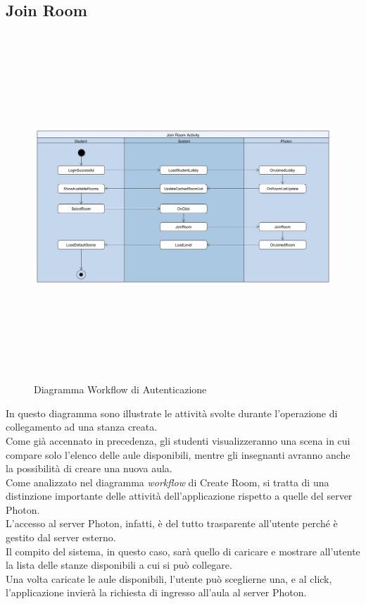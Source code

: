 \subsection{Join Room}
\begin{figure}[H]
    \centering
    \includegraphics[width = 17cm, height = 13cm]{Immagini/JoinRoomActivityDiagram.jpg}
    \caption{Diagramma Workflow di Autenticazione}
    \label{fig:my_label}
\end{figure}
In questo diagramma sono illustrate le attività svolte durante l'operazione di collegamento ad una stanza creata. 
\\Come già accennato in precedenza, gli studenti visualizzeranno una scena in cui compare solo l'elenco delle aule disponibili, mentre gli insegnanti avranno anche la possibilità di creare una nuova aula. 
\\Come analizzato nel diagramma \textit{workflow} di Create Room, si tratta di una distinzione importante delle attività dell'applicazione rispetto a quelle del server Photon. 
\\L'accesso al server Photon, infatti, è del tutto trasparente all'utente perché è gestito dal server esterno.
\\Il compito del sistema, in questo caso, sarà quello di caricare e mostrare all'utente la lista delle stanze disponibili a cui si può collegare.
\\Una volta caricate le aule disponibili, l'utente può sceglierne una, e al click, l'applicazione invierà la richiesta di ingresso all'aula al server Photon. 
